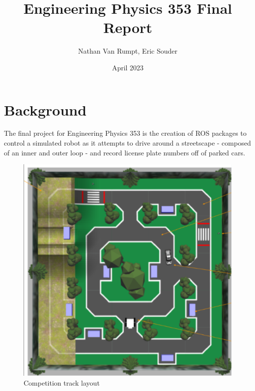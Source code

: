 \documentclass[titlepage, twocolumn]{article}
\newcommand{\subtitle}[1]{%
  \posttitle{%
    \par\end{center}
    \begin{center}\large#1\end{center}
    \vskip0.5em}%
}
\begin{document}
\title{Engineering Physics 353 Final Report}
\subtitle{Team 15}
\author{Nathan Van Rumpt, Eric Souder}
\date{April 2023}

\maketitle

\section{Background}

    The final project for Engineering Physics 353 is the creation of ROS packages to control a simulated robot as it attempts to drive around a streetscape - composed of an inner and outer loop - and record license plate numbers off of parked cars. 
    
    \begin{figure}
    \centering
    \includegraphics[width=0.7\linewidth]{Competition Space.png}
    \caption{Competition track layout}
    \label{fig:label}
    \end{figure}
    
\end{document}
